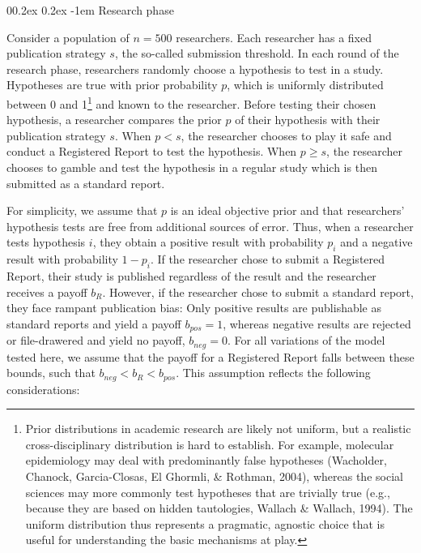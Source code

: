 \documentclass[
  ,man,mask,floatsintext]{apa6}
\makeatletter
\let\oldparagraph\paragraph
\renewcommand{\paragraph}[1]{\oldparagraph{#1}\mbox{}}
\renewcommand{\paragraph}{\@startsection{paragraph}{4}{\parindent}%
  {0\baselineskip \@plus 0.2ex \@minus 0.2ex}%
  {-1em}%
  {\normalfont\normalsize\bfseries\itshape\typesectitle}}
\makeatother
\begin{document}
\hypertarget{research-phase}{%
\paragraph{Research phase}\label{research-phase}}

Consider a population of \(n = 500\) researchers.
Each researcher has a fixed publication strategy \(s\), the so-called submission threshold.
In each round of the research phase, researchers randomly choose a hypothesis to test in a study.
Hypotheses are true with prior probability \(p\), which is uniformly distributed between 0 and 1\footnote{Prior distributions in academic research are likely not uniform, but a realistic cross-disciplinary distribution is hard to establish. For example, molecular epidemiology may deal with predominantly false hypotheses (Wacholder, Chanock, Garcia-Closas, El Ghormli, \& Rothman, 2004), whereas the social sciences may more commonly test hypotheses that are trivially true (e.g., because they are based on hidden tautologies, Wallach \& Wallach, 1994). The uniform distribution thus represents a pragmatic, agnostic choice that is useful for understanding the basic mechanisms at play.} and known to the researcher.
Before testing their chosen hypothesis, a researcher compares the prior \(p\) of their hypothesis with their publication strategy \(s\).
When \(p < s\), the researcher chooses to play it safe and conduct a Registered Report to test the hypothesis.
When \(p \geq s\), the researcher chooses to gamble and test the hypothesis in a regular study which is then submitted as a standard report.

For simplicity, we assume that \(p\) is an ideal objective prior and that researchers' hypothesis tests are free from additional sources of error.
Thus, when a researcher tests hypothesis \(i\), they obtain a positive result with probability \(p_i\) and a negative result with probability \(1-p_i\).
If the researcher chose to submit a Registered Report, their study is published regardless of the result and the researcher receives a payoff \(b_{R}\).
However, if the researcher chose to submit a standard report, they face rampant publication bias:
Only positive results are publishable as standard reports and yield a payoff \(b_{pos} = 1\), whereas negative results are rejected or file-drawered and yield no payoff, \(b_{neg} = 0\).
For all variations of the model tested here, we assume that the payoff for a Registered Report falls between these bounds, such that \(b_{neg} < b_{R} < b_{pos}\).
This assumption reflects the following considerations:
\end{document}
